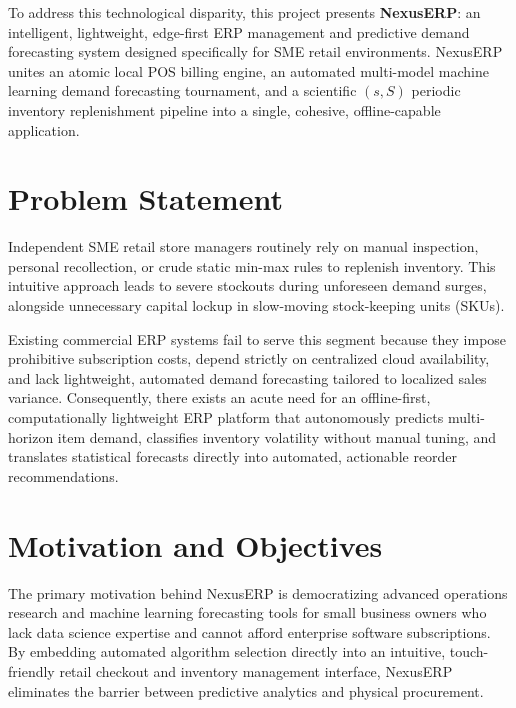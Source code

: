 To address this technological disparity, this project presents \textbf{NexusERP}: an intelligent, lightweight, edge-first ERP management and predictive demand forecasting system designed specifically for SME retail environments. NexusERP unites an atomic local POS billing engine, an automated multi-model machine learning demand forecasting tournament, and a scientific $(s, S)$ periodic inventory replenishment pipeline into a single, cohesive, offline-capable application.

\section{Problem Statement}
Independent SME retail store managers routinely rely on manual inspection, personal recollection, or crude static min-max rules to replenish inventory. This intuitive approach leads to severe stockouts during unforeseen demand surges, alongside unnecessary capital lockup in slow-moving stock-keeping units (SKUs). 

Existing commercial ERP systems fail to serve this segment because they impose prohibitive subscription costs, depend strictly on centralized cloud availability, and lack lightweight, automated demand forecasting tailored to localized sales variance. Consequently, there exists an acute need for an offline-first, computationally lightweight ERP platform that autonomously predicts multi-horizon item demand, classifies inventory volatility without manual tuning, and translates statistical forecasts directly into automated, actionable reorder recommendations.

\section{Motivation and Objectives}
The primary motivation behind NexusERP is democratizing advanced operations research and machine learning forecasting tools for small business owners who lack data science expertise and cannot afford enterprise software subscriptions. By embedding automated algorithm selection directly into an intuitive, touch-friendly retail checkout and inventory management interface, NexusERP eliminates the barrier between predictive analytics and physical procurement.

